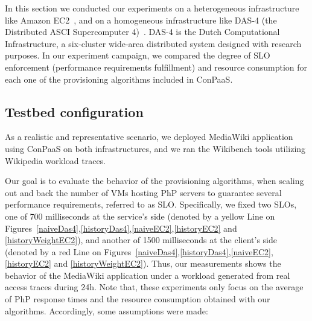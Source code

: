 In this section we conducted our experiments on a heterogeneous infrastructure like Amazon EC2~\cite{amazonEC2}, and on a homogeneous infrastructure like DAS-4 (the Distributed ASCI Supercomputer 4)~\cite{das4}. DAS-4 is the Dutch Computational Infrastructure, a six-cluster wide-area distributed system designed with research purposes. In our experiment campaign, we compared the degree of SLO enforcement (performance requirements fulfillment) and resource consumption for each one of the provisioning algorithms included in ConPaaS. 


\subsection*{Testbed configuration}

As a realistic and representative scenario, we deployed MediaWiki application using ConPaaS on both infrastructures, and we ran the Wikibench tools utilizing Wikipedia workload traces.  


Our goal is to evaluate the behavior of the provisioning algorithms, when scaling out and back the number of VMs hosting PhP servers to guarantee several performance requirements, referred to as SLO. Specifically, we fixed two SLOs, one of 700 milliseconds at the service's side (denoted by a yellow Line on Figures~\ref{naiveDas4},\ref{historyDas4},\ref{naiveEC2},\ref{historyEC2} and \ref{historyWeightEC2}), and another of 1500 milliseconds at the client's side (denoted by a red Line on Figures~\ref{naiveDas4},\ref{historyDas4},\ref{naiveEC2},\ref{historyEC2} and \ref{historyWeightEC2}). Thus, our measurements shows the behavior of the MediaWiki application under a workload generated from real access traces during 24h. Note that, these experiments only focus on the average of PhP response times and the resource consumption obtained with our algorithms. Accordingly, some assumptions were made:

